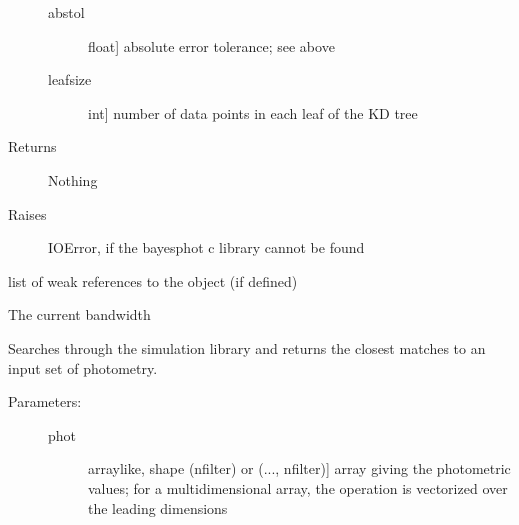 \documentclass[letterpaper,10pt,english]{sphinxmanual}
\begin{document}
\begin{fulllineitems}
\begin{fulllineitems}
\begin{description}
\begin{description}
\item[{abstol}] \leavevmode{[}float{]}
absolute error tolerance; see above

\item[{leafsize}] \leavevmode{[}int{]}
number of data points in each leaf of the KD tree

\end{description}

\item[{Returns}] \leavevmode
Nothing

\item[{Raises}] \leavevmode
IOError, if the bayesphot c library cannot be found

\end{description}

\end{fulllineitems}


\begin{fulllineitems}
\label{bayesphot:slugpy.bayesphot.bp.bp.__weakref__}
list of weak references to the object (if defined)

\end{fulllineitems}


\begin{fulllineitems}
\label{bayesphot:slugpy.bayesphot.bp.bp.bandwidth}
The current bandwidth

\end{fulllineitems}


\begin{fulllineitems}
\label{bayesphot:slugpy.bayesphot.bp.bp.bestmatch}
Searches through the simulation library and returns the closest
matches to an input set of photometry.
\begin{description}
\item[{Parameters:}] \leavevmode\begin{description}
\item[{phot}] \leavevmode{[}arraylike, shape (nfilter) or (..., nfilter){]}
array giving the photometric values; for a
multidimensional array, the operation is vectorized over
the leading dimensions


\end{description}
\end{description}
\end{fulllineitems}
\end{fulllineitems}
\end{document}

